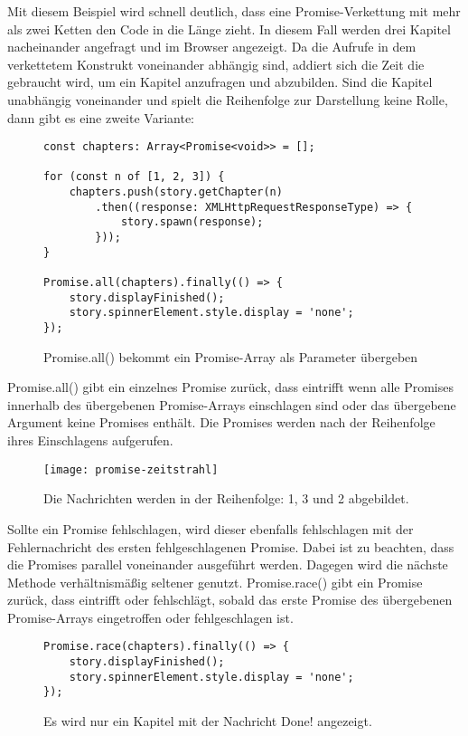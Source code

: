 \noindent
Mit diesem Beispiel wird schnell deutlich, dass eine Promise-Verkettung mit mehr als zwei Ketten den Code in die Länge zieht. In diesem Fall werden drei Kapitel nacheinander angefragt und im Browser angezeigt. Da die Aufrufe in dem verkettetem Konstrukt voneinander abhängig sind, addiert sich die Zeit die gebraucht wird, um ein Kapitel anzufragen und abzubilden. Sind die Kapitel unabhängig voneinander und spielt die Reihenfolge zur Darstellung keine Rolle, dann gibt es eine zweite Variante: 

\begin{figure}[H]
\begin{lstlisting}
const chapters: Array<Promise<void>> = [];

for (const n of [1, 2, 3]) {
    chapters.push(story.getChapter(n)
        .then((response: XMLHttpRequestResponseType) => {
            story.spawn(response);
        }));
}

Promise.all(chapters).finally(() => {
    story.displayFinished();
    story.spinnerElement.style.display = 'none';
});
\end{lstlisting}
\caption{Promise.all() bekommt ein Promise-Array als Parameter übergeben}
\end{figure}

\noindent
Promise.all() gibt ein einzelnes Promise zurück, dass eintrifft wenn alle Promises innerhalb des übergebenen Promise-Arrays einschlagen sind oder das übergebene Argument keine Promises enthält. Die Promises werden nach der Reihenfolge ihres Einschlagens aufgerufen.

\begin{figure}[H]
\centering
\texttt{[image: promise-zeitstrahl]}
\caption{Die Nachrichten werden in der Reihenfolge: 1, 3 und 2 abgebildet.}
\end{figure}

\noindent
Sollte ein Promise fehlschlagen, wird dieser ebenfalls fehlschlagen mit der Fehlernachricht des ersten fehlgeschlagenen Promise.\cite{promise-executor} Dabei ist zu beachten, dass die Promises parallel voneinander ausgeführt werden. Dagegen wird die nächste Methode verhältnismäßig seltener genutzt. Promise.race() gibt ein Promise zurück, dass eintrifft oder fehlschlägt, sobald das erste Promise des übergebenen Promise-Arrays eingetroffen oder fehlgeschlagen ist.\cite{versprechen}

\begin{figure}[H]
\begin{lstlisting}
Promise.race(chapters).finally(() => {
    story.displayFinished();
    story.spinnerElement.style.display = 'none';
});
\end{lstlisting}
\caption{Es wird nur ein Kapitel mit der Nachricht \glqq Done!\grqq{} angezeigt.}
\end{figure}

